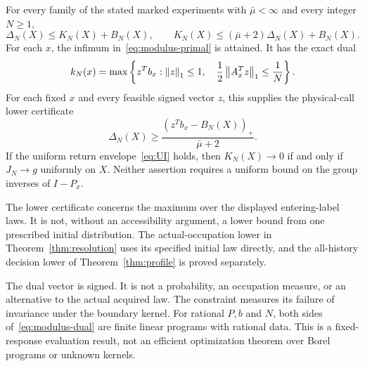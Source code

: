 \begin{theorem}\label{thm:modulus}
For every family of the stated marked experiments with $\bar\mu<\infty$ and every integer $N\ge1$,
\begin{equation}\label{eq:modulus-comparison}
 \Delta_N(X)\le K_N(X)+B_N(X),
 \qquad K_N(X)\le(\bar\mu+2)\Delta_N(X)+B_N(X).
\end{equation}
For each $x$, the infimum in~\eqref{eq:modulus-primal} is attained. It has the exact dual
\begin{equation}\label{eq:modulus-dual}
 k_N(x)=\max\left\{z^Tb_x:
       \left\lVert z\right\rVert_1\le1,\quad \frac12\left\lVert A_x^Tz\right\rVert_1\le\frac1N\right\}.
\end{equation}
For each fixed $x$ and every feasible signed vector $z$, this supplies the physical-call lower certificate
\begin{equation}\label{eq:dual-lower}
 \Delta_N(X)\ge
 \frac{(z^Tb_x-B_N(X))_+}{\bar\mu+2}.
\end{equation}
If the uniform return envelope~\eqref{eq:UI} holds, then $K_N(X)\to0$ if and only if $J_N\to g$ uniformly on $X$. Neither assertion requires a uniform bound on the group inverses of $I-P_x$.
\end{theorem}
The lower certificate concerns the maximum over the displayed entering-label laws. It is not, without an accessibility argument, a lower bound from one prescribed initial distribution. The actual-occupation lower in Theorem~\ref{thm:resolution} uses its specified initial law directly, and the all-history decision lower of Theorem~\ref{thm:profile} is proved separately.

The dual vector is signed. It is not a probability, an occupation measure, or an alternative to the actual acquired law. The constraint measures its failure of invariance under the boundary kernel. For rational $P,b$ and $N$, both sides of~\eqref{eq:modulus-dual} are finite linear programs with rational data. This is a fixed-response evaluation result, not an efficient optimization theorem over Borel programs or unknown kernels.

